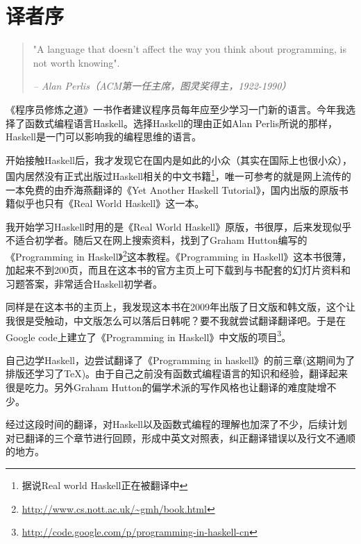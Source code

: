 
\chapter*{译者序}

\begin{quotation}
"A language that doesn't affect the way you think about programming, is not worth knowing".
\begin{flushright}
\textit{-- Alan Perlis（ACM第一任主席，图灵奖得主，1922-1990）}
\end{flushright}
\end{quotation}

《程序员修炼之道》一书作者建议程序员每年应至少学习一门新的语言。今年我选择了函数式编程语言Haskell。选择Haskell的理由正如Alan
Perlis所说的那样，Haskell是一门可以影响我的编程思维的语言。

开始接触Haskell后，我才发现它在国内是如此的小众（其实在国际上也很小众），国内居然没有正式出版过Haskell相关的中文书籍\footnote{据说Real world Haskell正在被翻译中}，唯一可参考的就是网上流传的一本免费的由乔海燕翻译的《Yet Another Haskell Tutorial》，国内出版的原版书籍似乎也只有《Real World Haskell》这一本。

我开始学习Haskell时用的是《Real World Haskell》原版，书很厚，后来发现似乎不适合初学者。随后又在网上搜索资料，找到了Graham
Hutton编写的《Programming in Haskell》\footnote{\url{http://www.cs.nott.ac.uk/~gmh/book.html}}这本教程。《Programming in
Haskell》这本书很薄，加起来不到200页，而且在这本书的官方主页上可下载到与书配套的幻灯片资料和习题答案，非常适合Haskell初学者。

同样是在这本书的主页上，我发现这本书在2009年出版了日文版和韩文版，这个让我很是受触动，中文版怎么可以落后日韩呢？要不我就尝试翻译翻译吧。于是在Google
code上建立了《Programming in
Haskell》中文版的项目\footnote{\url{http://code.google.com/p/programming-in-haskell-cn}}。

自己边学Haskell，边尝试翻译了《Programming in
haskell》的前三章(这期间为了排版还学习了\TeX)。由于自己之前没有函数式编程语言的知识和经验，翻译起来很是吃力。另外Graham
Hutton的偏学术派的写作风格也让翻译的难度陡增不少。

经过这段时间的翻译，对Haskell以及函数式编程的理解也加深了不少，后续计划对已翻译的三个章节进行回顾，形成中英文对照表，纠正翻译错误以及行文不通顺的地方。
